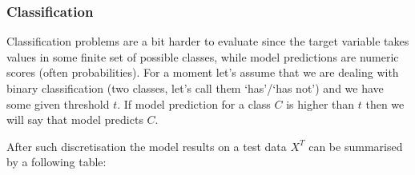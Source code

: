 \documentclass[12pt,]{krantz}
\begin{document}
\hypertarget{classification}{%
\subsubsection{Classification}\label{classification}}

Classification problems are a bit harder to evaluate since the target variable takes values in some finite set of possible classes, while model predictions are numeric scores (often probabilities). For a moment let's assume that we are dealing with binary classification (two classes, let's call them `has'/`has not') and we have some given threshold \(t\). If model prediction for a class \(C\) is higher than \(t\) then we will say that model predicts \(C\).

After such discretisation the model results on a test data \(X^T\) can be summarised by a following table:
\end{document}
